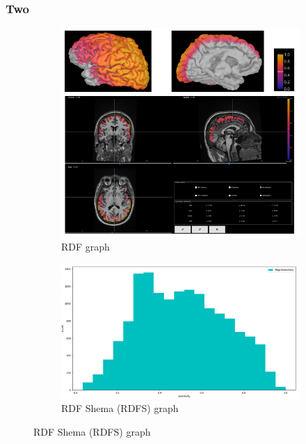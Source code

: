 \documentclass{beamer}
\numberwithin{figure}{section}
\numberwithin{equation}{section}
\begin{document}
\section{}
\begin{frame}
 \frametitle{Two}
  

 	\begin{figure}[h]
        \begin{subfigure}[h]{0.53\linewidth} 
            \includegraphics[width=\linewidth]{pictures/meg2}
            \caption{\tiny RDF graph}
            \label{fig:rdf_graph}
        \end{subfigure}       
        \begin{subfigure}[h]{0.45\linewidth} 
            \includegraphics[width=\linewidth]{pictures/HISTmeg1.png}
            \caption{\tiny RDF Shema (RDFS) graph}
            \label{fig:rdfs_graph}
        \end{subfigure}
    \end{figure}

  
\end{frame}
\end{document}

